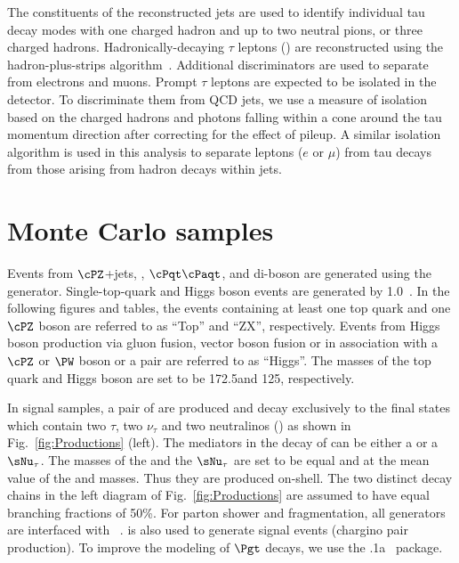 The constituents of the reconstructed jets are used to identify individual tau decay modes with one charged hadron and up to two neutral pions, or three charged hadrons. Hadronically-decaying $\tau$ leptons (\Tau) are reconstructed using the hadron-plus-strips algorithm~\cite{Khachatryan:2015dfa}.
Additional discriminators are used to separate \Tau from electrons and muons.
Prompt $\tau$ leptons are expected to be isolated in the detector.
To discriminate them from QCD jets, we use a measure of isolation 
based on the charged hadrons and photons falling within 
a cone around the tau momentum direction after correcting for the effect of
pileup.
 A similar isolation algorithm is 
used in this analysis to separate leptons ($e$ or $\mu$) from tau decays from 
those arising from hadron decays within jets.

\section{Monte Carlo samples}
\label{sect:MCSamples}
Events from $\cPZ$+jets, \wjets, $\cPqt\cPaqt$, and di-boson 
are generated using the ~\cite{Alwall:2011uj} generator. 
Single-top-quark and Higgs boson events are generated by {\POWHEG} 1.0~\cite{Nason:2004rx,Frixione:2007vw,Alioli:2009je,Alioli:2010xd}.
In the following figures and tables, the events containing at least one top quark and one $\cPZ$ boson are referred to as ``Top'' and ``ZX'', respectively. 
Events from Higgs boson production via gluon fusion, vector boson fusion or in association with a $\cPZ$ or $\PW$ boson or a \ttbar pair are referred to as ``Higgs''. The masses of the top quark and Higgs boson are set to be 172.5\GeV and 125\GeV, respectively.

In signal samples, a pair of \chione 
are produced and decay exclusively to the final states which contain two $\tau$, two $\nu_{\tau}$ and 
two neutralinos (\PSGczDo) as shown in Fig.~\ref{fig:Productions} (left). 
The mediators in the decay of \chione can be either a \sTau or a $\sNu_{\tau}$. 
The masses of the \sTau and the $\sNu_{\tau}$ are set to be equal and at the mean value of the \chione and \PSGczDo masses. 
Thus they are produced on-shell.
The two distinct decay chains in the left diagram of Fig.~\ref{fig:Productions} 
are assumed to have equal branching fractions of 50\%. 
For parton shower and fragmentation, all generators are interfaced with ~\cite{Sjostrand:2006za}.
\PYTHIA is also used to generate signal events (chargino pair production). To improve the modeling of $\Pgt$ decays, 
we use the .1a~\cite{Davidson:2010rw} package. 


